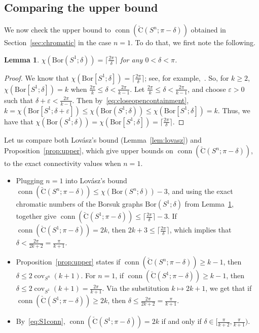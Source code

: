 \documentclass[11 pt,a4paper,twoside,reqno]{amsart}
\newtheorem{lemma}[theorem]{Lemma}
\theoremstyle{definition}
\newcommand{\cech}[2]{\mathrm{\check{C}}(#1;#2)}
\DeclareMathOperator{\conn}{conn}
\DeclareMathOperator{\cov}{cov}
\newcommand{\bor}[2]{\mathrm{Bor}(#1;#2)}
\newcommand{\cbor}[2]{\mathrm{Bor}[#1;#2]}
\begin{document}
\subsection{Comparing the upper bound}
\label{sec:compareupperbound}
We now check the upper bound to $\conn(\cech{S^n}{\pi-\delta})$ obtained in Section~\ref{sec:chromatic} in the case $n=1$.
To do that, we first note the following.

\begin{lemma}
\label{lem:chromatic_num}
$\chi(\bor{S^1}{\delta}) = \bigl\lceil\frac{2\pi}{\delta}\bigr\rceil$ for any $0<\delta< \pi$.
\end{lemma}

\begin{proof}
We know that $\chi(\cbor{S^1}{\delta}) = \bigl\lceil\frac{2\pi}{\delta}\bigr\rceil$; see, for example,~\cite[Section 5.1.2]{MoyPhD}.
So, for $k\geq 2$, $\chi(\cbor{S^1}{\delta}) = k$ when $\tfrac{2\pi}{k} \leq \delta < \tfrac{2\pi}{k-1}$.
Let $\tfrac{2\pi}{k} \leq \delta < \tfrac{2\pi}{k-1}$, and choose $\varepsilon > 0$ such that $\delta + \varepsilon < \tfrac{2\pi}{k-1}$.
Then by~\eqref{eq:closeopencontainment}, $k=\chi(\cbor{S^1}{\delta+\varepsilon}) \leq \chi(\bor{S^1}{\delta}) \leq \chi(\cbor{S^1}{\delta})= k$.
Thus, we have that $\chi(\bor{S^1}{\delta}) = \chi(\cbor{S^1}{\delta})= \bigl\lceil\frac{2\pi}{\delta}\bigr\rceil$.
\end{proof}

Let us compare both Lov{\'a}sz's bound (Lemma~\ref{lem:lovasz}) and Proposition~\ref{prop:upper}, which give upper bounds on $\conn(\cech{S^n}{\pi-\delta})$, to the exact connectivity values when $n=1$.

\begin{itemize}
\item
Plugging $n=1$ into Lov{\'a}sz's bound $\conn(\cech{S^n}{\pi-\delta}) \le \chi(\bor{S^n}{\delta}) - 3$, and using the exact chromatic numbers of the Borsuk graphs $\bor{S^1}{\delta}$ from Lemma~\ref{lem:chromatic_num}, together give $\conn(\cech{S^1}{\pi-\delta}) \le \bigl\lceil\tfrac{2\pi}{\delta}\bigr\rceil - 3$.
If $\conn(\cech{S^1}{\pi-\delta}) = 2k$, then $2k+3 \le \bigl\lceil\tfrac{2\pi}{\delta}\bigr\rceil$, which implies that $\delta < \tfrac{2\pi}{2k+2} = \tfrac{\pi}{k+1}$.
\item
Proposition~\ref{prop:upper} states if $\conn(\cech{S^n}{\pi-\delta}) \ge k-1$, then $\delta\le 2\cov_{S^n}(k+1)$.
For $n=1$, if $\conn(\cech{S^1}{\pi-\delta}) \ge k-1$, then $\delta\le 2\cov_{S^1}(k+1) = \tfrac{2\pi}{k+1}$.
Via the substitution $k\mapsto 2k+1$, we get that if $\conn(\cech{S^1}{\pi-\delta}) \ge 2k$, then $\delta\le \tfrac{2\pi}{2k+2} = \tfrac{\pi}{k+1}$.
\item
By~\eqref{eq:S1conn}, $\conn(\cech{S^1}{\pi-\delta}) = 2k$ if and only if $\delta \in \bigl[\tfrac{\pi}{k+2},\tfrac{\pi}{k+1}\bigr)$.
\end{itemize}
\end{document}
